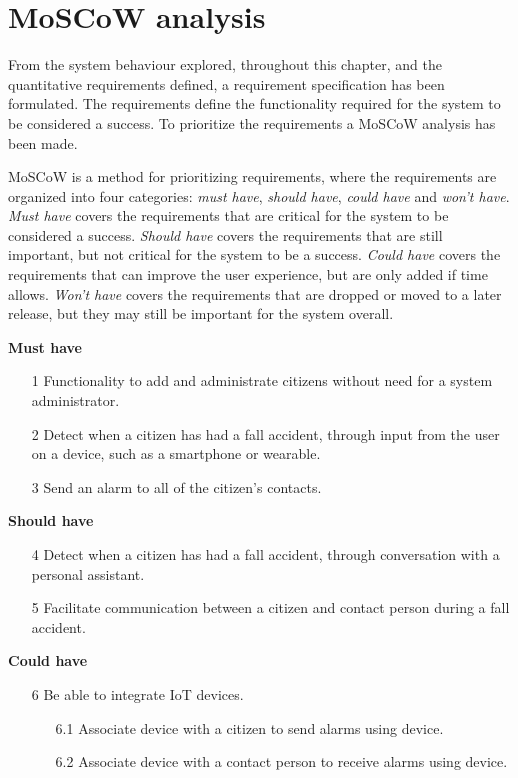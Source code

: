\section{MoSCoW analysis}\label{sec:moscow}
From the system behaviour explored, throughout this chapter, and the quantitative requirements defined, a requirement specification has been formulated. The requirements define the functionality required for the system to be considered a success. To prioritize the requirements a MoSCoW analysis has been made.

MoSCoW is a method for prioritizing requirements, where the requirements are organized into four categories: \textit{must have}, \textit{should have}, \textit{could have} and \textit{won't have}.
\textit{Must have} covers the requirements that are critical for the system to be considered a success. \textit{Should have} covers the requirements that are still important, but not critical for the system to be a success. \textit{Could have} covers the requirements that can improve the user experience, but are only added if time allows. \textit{Won't have} covers the requirements that are dropped or moved to a later release, but they may still be important for the system overall.

\textbf{Must have}
\begin{itemize}
    \item[1] Functionality to add and administrate citizens without need for a system administrator.
    \item[2] Detect when a citizen has had a fall accident, through input from the user on a device, such as a smartphone or wearable.
    \item[3] Send an alarm to all of the citizen's contacts.
\end{itemize}

\textbf{Should have}
\begin{itemize}
    \item[4] Detect when a citizen has had a fall accident, through conversation with a personal assistant.
    \item[5] Facilitate communication between a citizen and contact person during a fall accident.
\end{itemize}

\textbf{Could have}
\begin{itemize}
    \item[6] Be able to integrate IoT devices.
        \begin{itemize}
            \item[6.1] Associate device with a citizen to send alarms using device.
            \item[6.2] Associate device with a contact person to receive alarms using device.
        \end{itemize}
\end{itemize}

